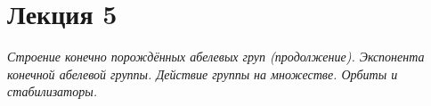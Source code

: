 \documentclass[a4paper,10pt]{amsart}
\def\ZZ{{\mathbb Z}}%
\def\NN{{\mathbb N}}%
\newtheorem{proposition}{Предложение}
\newtheorem{corollary}{Следствие}
\theoremstyle{definition}
\newtheorem{definition}{Определение}
\theoremstyle{remark}
\newtheorem{remark}{Замечание}
\begin{document}
%
%
%
%
%
%

\newpage

\section*{Лекция 5}

\medskip

{\it Строение конечно порождённых абелевых груп (продолжение). Экспонента
конечной абелевой группы. Действие группы на множестве. Орбиты и стабилизаторы.}
\end{document}
